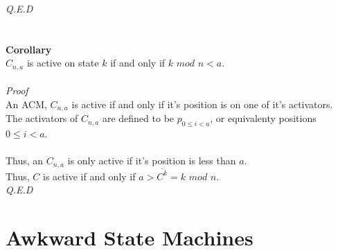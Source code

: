 \documentclass[a4paper,12pt]{article}
\begin{document}
\textit{Q.E.D}\\   
\\
\\
\textbf{Corollary}\\
$C_{n,a}$ is active on state $k$ if and only if $k$ $mod$ $n < a$.\\
\\
\textit{Proof}\\
An ACM, $C_{n,a}$ is active if and only if it's position is on one of it's activators.\\
The activators of $C_{n,a}$ are defined to be $p_{0 \leq i < a}$, or equivalenty positions $0 \leq i < a$.\\
\\
Thus, an $C_{n,a}$ is only active if it's position is less than $a$.\\
Thus, $C$ is active if and only if $a > \overline{C^k} = k$ $mod$ $n$.\\
\textit{Q.E.D} 
  
\section{Awkward State Machines}
\end{document}
